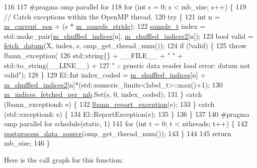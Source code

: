 \begin{DoxyCode}
116 
117 \textcolor{preprocessor}{  #pragma omp parallel for}
118   \textcolor{keywordflow}{for} (\textcolor{keywordtype}{int} s = 0; s < mb\_size; s++) \{
119     \textcolor{comment}{// Catch exceptions within the OpenMP thread.}
120     \textcolor{keywordflow}{try} \{
121       \textcolor{keywordtype}{int} n = \hyperlink{classlbann_1_1generic__data__reader_a2facf4e410099ac8c1fa586e797ec2e0}{m\_current\_pos} + (s * \hyperlink{classlbann_1_1generic__data__reader_a58461c39de7e17eafc5b98aec99cbb9b}{m\_sample\_stride});
122       \hyperlink{classlbann_1_1data__reader__mnist__siamese_af159922f68098bfcb16a9df46d501103}{sample\_t} index = std::make\_pair(\hyperlink{classlbann_1_1generic__data__reader_aaab6aeff67ffff1c689336851fec2c57}{m\_shuffled\_indices}[n], 
      \hyperlink{classlbann_1_1data__reader__mnist__siamese_a42a4b1513a7305cc62d219ac0d9473c3}{m\_shuffled\_indices2}[n]);
123       \textcolor{keywordtype}{bool} valid = \hyperlink{classlbann_1_1data__reader__mnist__siamese_a299dd32be165c5acf320b6f40404cb17}{fetch\_datum}(X, index, s, omp\_get\_thread\_num());
124       \textcolor{keywordflow}{if} (!valid) \{
125         \textcolor{keywordflow}{throw} lbann\_exception(
126           std::string\{\} + \_\_FILE\_\_ + \textcolor{stringliteral}{" "} + std::to\_string(\_\_LINE\_\_) +
127           \textcolor{stringliteral}{" :: generic data reader load error: datum not valid"});
128       \}
129       El::Int index\_coded = \hyperlink{classlbann_1_1generic__data__reader_aaab6aeff67ffff1c689336851fec2c57}{m\_shuffled\_indices}[n] + 
      \hyperlink{classlbann_1_1data__reader__mnist__siamese_a42a4b1513a7305cc62d219ac0d9473c3}{m\_shuffled\_indices2}[n]*(std::numeric\_limits<label\_t>::max()+1);
130       \hyperlink{classlbann_1_1generic__data__reader_a4ee1a159c74561c15a5e0c267ad3cc6a}{m\_indices\_fetched\_per\_mb}.Set(s, 0, index\_coded);
131     \} \textcolor{keywordflow}{catch} (lbann\_exception& e) \{
132       \hyperlink{namespacelbann_aedccb3bf2d674ccb5573ab9960720731}{lbann\_report\_exception}(e);
133     \} \textcolor{keywordflow}{catch} (std::exception& e) \{
134       El::ReportException(e);
135     \}
136   \}
137 
140 \textcolor{preprocessor}{  #pragma omp parallel for schedule(static, 1)}
141   \textcolor{keywordflow}{for} (\textcolor{keywordtype}{int} t = 0; t < nthreads; t++) \{
142     \hyperlink{classlbann_1_1generic__data__reader_a7bbf74725a96235dc1cd20ff440a69bd}{postprocess\_data\_source}(omp\_get\_thread\_num());
143   \}
144 
145   \textcolor{keywordflow}{return} mb\_size;
146 \}
\end{DoxyCode}
Here is the call graph for this function\+:\nopagebreak

